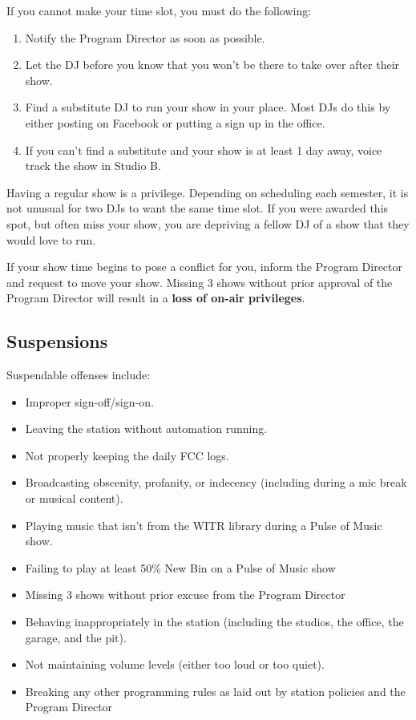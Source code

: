 \documentclass{witrman}
\begin{document}
If you cannot make your time slot, you must do the following:

\begin{enumerate}
    \item Notify the Program Director as soon as possible.
    \item Let the DJ before you know that you won't be there to take over after
        their show.
    \item Find a substitute DJ to run your show in your place.  Most DJs do
        this by either posting on Facebook or putting a sign up in the office.
    \item If you can't find a substitute and your show is at least 1 day away,
        voice track the show in Studio B.
\end{enumerate}

Having a regular show is a privilege.  Depending on scheduling each semester, it
is not unusual for two DJs to want the same time slot.  If you were awarded this
spot, but often miss your show, you are depriving a fellow DJ of a show that
they would love to run.

If your show time begins to pose a conflict for you, inform the Program Director
and request to move your show.  Missing 3 shows without prior approval of the
Program Director will result in a \textbf{loss of on-air privileges}.


\subsection{Suspensions}

Suspendable offenses include:

\begin{itemize}
    \item Improper sign-off/sign-on.
    \item Leaving the station without automation running. 
    \item Not properly keeping the daily FCC logs.
    \item Broadcasting obscenity, profanity, or indecency (including during a
        mic break or musical content).
    \item Playing music that isn't from the WITR library during a Pulse of Music
        show.
    \item Failing to play at least 50\% New Bin on a Pulse of Music show
    \item Missing 3 shows without prior excuse from the Program Director
    \item Behaving inappropriately in the station (including the studios, the
        office, the garage, and the pit).
    \item Not maintaining volume levels (either too loud or too quiet).
    \item Breaking any other programming rules as laid out by station policies
        and the Program Director
\end{itemize}
\end{document}

